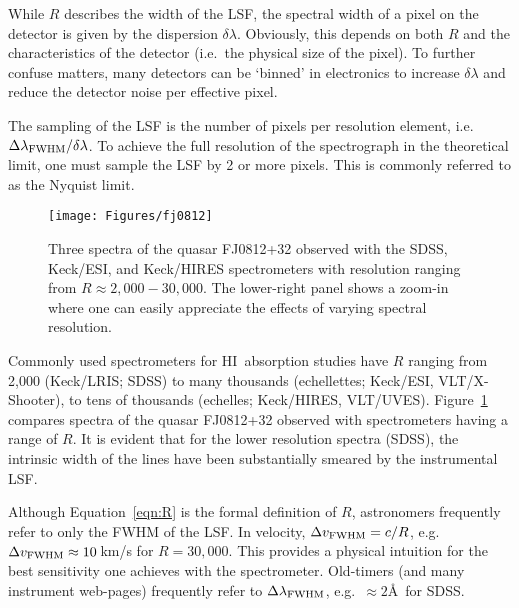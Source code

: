 \documentclass[graybox]{svmult}
\newcommand{\HI}{H{\sc I}}
\begin{document}
While $R$ describes the width of the LSF, the spectral
width of a pixel on the detector is given by the dispersion
$\delta \lambda$.  Obviously, this depends on both $R$ 
and the characteristics of the detector (i.e.\ the
physical size of the pixel).  To further confuse matters,
many detectors can be `binned' in electronics
to increase $\delta\lambda$ and reduce the detector noise
per effective pixel.  

The sampling of the LSF is the number of pixels per resolution element,
i.e.\  $\Delta\lambda_{\rm FWHM} / \delta\lambda$.  To achieve the
full resolution of the spectrograph in the theoretical limit,
one must sample the LSF by 2 or more pixels.  This is commonly
referred to as the Nyquist limit.  


%
\begin{figure}[ht]
\sidecaption
\texttt{[image: Figures/fj0812]}
%
%
\caption{Three spectra of the quasar FJ0812+32 observed with the
SDSS, Keck/ESI, and Keck/HIRES spectrometers with resolution ranging
from $R \approx 2,000 - 30,000$.  The lower-right panel shows
a zoom-in where one can easily appreciate the effects of varying
spectral resolution.
}
\label{fig:R}       %
\end{figure}

Commonly used spectrometers for \HI\ absorption studies
have $R$ ranging
from 2,000 (Keck/LRIS; SDSS) to many thousands (echellettes; 
Keck/ESI, VLT/X-Shooter), to tens of thousands
(echelles; Keck/HIRES, VLT/UVES).  Figure~\ref{fig:R}
compares spectra of the quasar FJ0812+32 observed
with spectrometers having a range of $R$.  It is evident
that for the lower resolution spectra (SDSS), the intrinsic
width of the lines have been substantially smeared by the 
instrumental LSF.

Although Equation~\ref{eqn:R} is the formal definition of $R$,
astronomers frequently refer to only the FWHM of the LSF.  
In velocity,
$\Delta v_{\rm FWHM} = c/R$, e.g. 
$\Delta v_{\rm FWHM} \approx 10$\,km/s for $R = 30,000$.
This provides a physical intuition for the best sensitivity
one achieves with the spectrometer.  
Old-timers (and many instrument web-pages)
frequently refer to $\Delta \lambda_{\rm FWHM}$, e.g.\ $\approx 2$\AA\
for SDSS.
\end{document}
